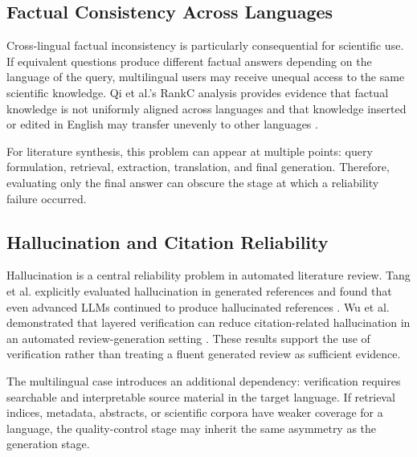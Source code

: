 \documentclass[acmsmall,screen,review]{acmart}
\begin{document}

\subsection{Factual Consistency Across Languages}
\label{sec:factual-consistency}

Cross-lingual factual inconsistency is particularly consequential for scientific use. If equivalent questions produce different factual answers depending on the language of the query, multilingual users may receive unequal access to the same scientific knowledge. Qi et al.'s RankC analysis provides evidence that factual knowledge is not uniformly aligned across languages and that knowledge inserted or edited in English may transfer unevenly to other languages \citep{qi2023crosslingual}.

For literature synthesis, this problem can appear at multiple points: query formulation, retrieval, extraction, translation, and final generation. Therefore, evaluating only the final answer can obscure the stage at which a reliability failure occurred.


\subsection{Hallucination and Citation Reliability}
\label{sec:hallucination}

Hallucination is a central reliability problem in automated literature review. Tang et al. explicitly evaluated hallucination in generated references and found that even advanced LLMs continued to produce hallucinated references \citep{tang2025automated}. Wu et al. demonstrated that layered verification can reduce citation-related hallucination in an automated review-generation setting \citep{wu2025automated}. These results support the use of verification rather than treating a fluent generated review as sufficient evidence.

The multilingual case introduces an additional dependency: verification requires searchable and interpretable source material in the target language. If retrieval indices, metadata, abstracts, or scientific corpora have weaker coverage for a language, the quality-control stage may inherit the same asymmetry as the generation stage.
\end{document}
